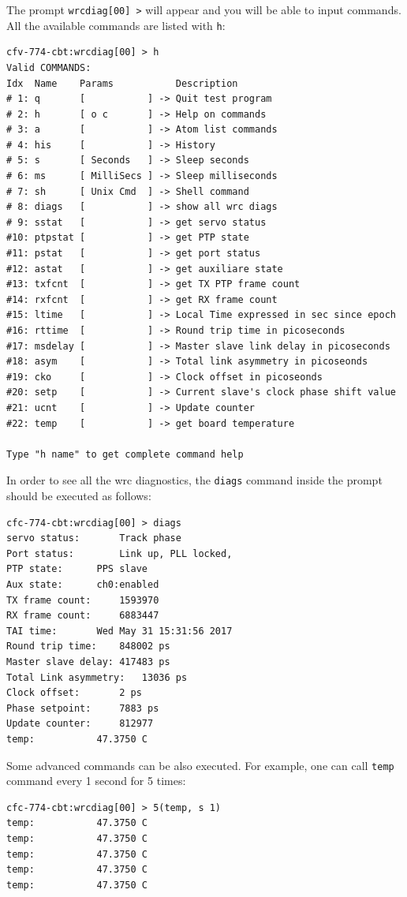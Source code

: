 \documentclass[a4paper, 12pt]{article}
\renewcommand{\_}{\underscore\allowbreak}
\begin{document}
The prompt \texttt{wrcdiag[00] >} will appear and you will be able to input commands.
All the available commands are listed with \texttt{h}:
\begin{lstlisting}[basicstyle=\scriptsize\ttfamily]
cfv-774-cbt:wrcdiag[00] > h
Valid COMMANDS:
Idx  Name    Params           Description
# 1: q       [           ] -> Quit test program
# 2: h       [ o c       ] -> Help on commands
# 3: a       [           ] -> Atom list commands
# 4: his     [           ] -> History
# 5: s       [ Seconds   ] -> Sleep seconds
# 6: ms      [ MilliSecs ] -> Sleep milliseconds
# 7: sh      [ Unix Cmd  ] -> Shell command
# 8: diags   [           ] -> show all wrc diags
# 9: sstat   [           ] -> get servo status
#10: ptpstat [           ] -> get PTP state
#11: pstat   [           ] -> get port status
#12: astat   [           ] -> get auxiliare state
#13: txfcnt  [           ] -> get TX PTP frame count
#14: rxfcnt  [           ] -> get RX frame count
#15: ltime   [           ] -> Local Time expressed in sec since epoch
#16: rttime  [           ] -> Round trip time in picoseconds
#17: msdelay [           ] -> Master slave link delay in picoseconds
#18: asym    [           ] -> Total link asymmetry in picoseonds
#19: cko     [           ] -> Clock offset in picoseonds
#20: setp    [           ] -> Current slave's clock phase shift value
#21: ucnt    [           ] -> Update counter
#22: temp    [           ] -> get board temperature

Type "h name" to get complete command help
\end{lstlisting}
In order to see all the wrc diagnostics, the \texttt{diags} command inside the prompt should
be executed as follows:
\begin{lstlisting}
cfc-774-cbt:wrcdiag[00] > diags
servo status:		Track phase
Port status:		Link up, PLL locked,
PTP state:		PPS slave
Aux state:		ch0:enabled
TX frame count:		1593970
RX frame count:		6883447
TAI time:		Wed May 31 15:31:56 2017
Round trip time:	848002 ps
Master slave delay:	417483 ps
Total Link asymmetry:	13036 ps
Clock offset:		2 ps
Phase setpoint:		7883 ps
Update counter:		812977
temp:			47.3750 C
\end{lstlisting}
Some advanced commands can be also executed. For example, one can call
\texttt{temp} command every 1 second for 5 times:
\begin{lstlisting}
cfc-774-cbt:wrcdiag[00] > 5(temp, s 1)
temp:			47.3750 C
temp:			47.3750 C
temp:			47.3750 C
temp:			47.3750 C
temp:			47.3750 C
\end{lstlisting}
\end{document}
